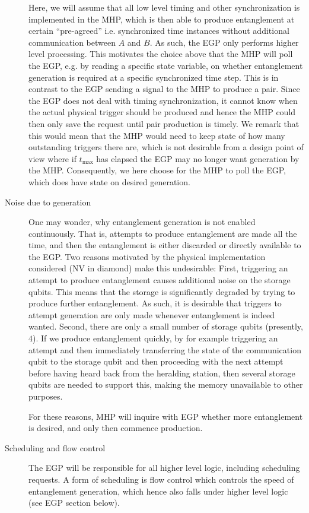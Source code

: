 \documentclass{article}
\begin{document}
\begin{description}
Here, we will assume that all low level timing and other synchronization is implemented in the MHP, which is then able to produce entanglement
at certain ``pre-agreed'' i.e. synchronized
time instances without additional communication between $A$ and $B$. As such, the EGP only performs higher level processing.
This motivates the choice above that the MHP will poll the EGP, e.g. by reading a specific state variable, on whether entanglement generation is required at a specific synchronized time step. This is in contrast to the EGP sending a signal to the MHP to produce a pair. Since the EGP does not deal with timing synchronization,
it cannot know when the actual physical trigger should be produced and hence the MHP could then only save the request until pair production is timely.
We remark that this would mean that the MHP would need to keep state
of how many outstanding triggers there are, which is not desirable from a design point of view where if $t_{\max}$ has elapsed the EGP may no longer want generation by the MHP. Consequently, we here choose for the MHP to poll the EGP, which does have state on desired generation.

\item[Noise due to generation]
One may wonder, why entanglement generation is not enabled continuously. That is, attempts to produce entanglement are made all the time, and then
the entanglement is either discarded or directly available to the EGP.
Two reasons motivated by the physical implementation considered (NV in diamond) make this undesirable:
First, triggering an attempt to produce entanglement causes additional noise on the storage qubits. This means that the storage is significantly degraded
by trying to produce further entanglement. As such, it is desirable that triggers to attempt generation are only made whenever entanglement is indeed wanted.
Second, there are only a small number of storage qubits (presently, $4$). If we produce entanglement quickly, by for example triggering an attempt and then immediately transferring the state of the communication qubit to the storage qubit and then proceeding with the next attempt before having heard back from the heralding station,
then several storage qubits are needed to support this, making the memory unavailable to other purposes.

For these reasons, MHP will inquire with EGP whether more entanglement is desired, and only then commence production.

\item[Scheduling and flow control]
The EGP will be responsible for all higher level logic, including scheduling requests. A form of scheduling
is flow control which controls the speed of entanglement generation, which hence also falls under higher level logic
(see EGP section below).


\end{description}
\end{document}
